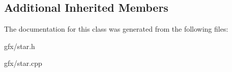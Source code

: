 \subsection*{Additional Inherited Members}


The documentation for this class was generated from the following files\+:\begin{DoxyCompactItemize}
\item 
gfx/star.\+h\item 
gfx/star.\+cpp\end{DoxyCompactItemize}
